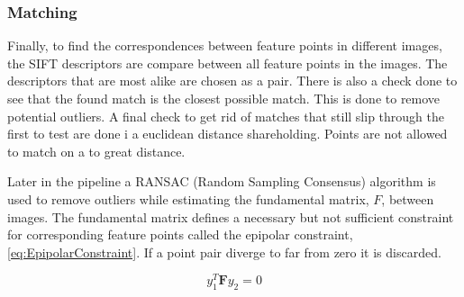 \subsubsection{Matching}
Finally, to find the correspondences between feature points in different images, the SIFT descriptors are compare between all feature points in the images. The descriptors that are most alike are chosen as a pair. There is also a check done to see that the found match is the closest possible match. This is done to remove potential outliers. A final check to get rid of matches that still slip through the first to test are done i a euclidean distance shareholding. Points are not allowed to match on a to great distance.

Later in the pipeline a RANSAC (Random Sampling Consensus) algorithm is used to remove outliers while estimating the fundamental matrix, $F$, between images. The fundamental matrix defines a necessary but not sufficient constraint for corresponding feature points called the epipolar constraint, \ref{eq:EpipolarConstraint}. If a point pair diverge to far from zero it is discarded.

\begin{equation}
\label{eq:EpipolarConstraint}
y_1^T \boldsymbol{F} y_2 = 0
\end{equation} 



